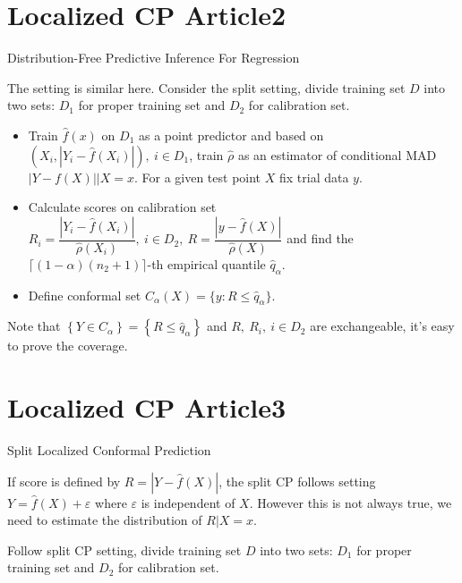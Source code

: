 \documentclass[12pt, a4paper, oneside]{article}
\begin{document}
\section{Localized CP Article2}
    Distribution-Free Predictive Inference For Regression\cite{lei2018distribution}


    The setting is similar here. Consider the split setting, divide training set $D$ into two sets: $D_1$ for proper training set and $D_2$ for calibration set.
    \begin{itemize}
        \item Train $\hat{f}(x)$ on $D_1$ as a point predictor and based on $(X_i,|Y_i-\hat{f}(X_i)|),\ i\in D_1$, train $\hat{\rho}$ as an estimator of conditional MAD $|Y-f(X)|\Big|X=x$. For a given test point $X$ fix trial data $y$.
        \item Calculate scores on calibration set $R_i=\dfrac{|Y_i-\hat{f}(X_i)|}{\hat{\rho}(X_i)},\ i\in D_2,\ R=\dfrac{|y-\hat{f}(X)|}{\hat{\rho}(X)}$ and find the $\lceil(1-\alpha)(n_2+1)\rceil$-th empirical quantile $\hat{q}_\alpha$.
        \item Define conformal set $C_\alpha(X)=\{y:R\leq\hat{q}_\alpha\}$.
    \end{itemize}
    Note that $\left\{ Y\in C_\alpha \right\}=\left\{ R\leq\hat{q}_\alpha \right\}$ and $R,\ R_i,\ i\in D_2$ are exchangeable, it's easy to prove the coverage.


\section{Localized CP Article3}
    Split Localized Conformal Prediction\cite{han2022split}


    If score is defined by $R=|Y-\hat{f}(X)|$, the split CP follows setting $Y=\hat{f}(X)+\varepsilon$ where $\varepsilon$ is independent of $X$. However this is not always true, we need to estimate the distribution of $R|X=x$.


    Follow split CP setting, divide training set $D$ into two sets: $D_1$ for proper training set and $D_2$ for calibration set. 
    
\end{document}
